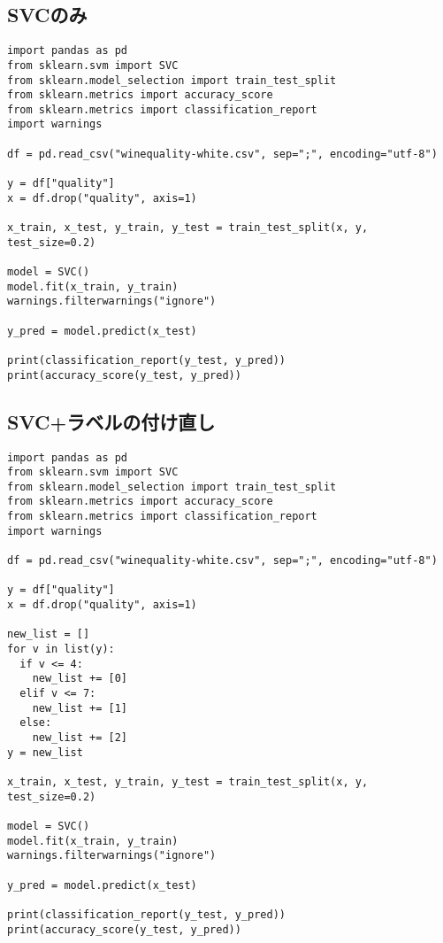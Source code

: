 \documentclass[a4paper, titlepage]{jsarticle}
\begin{document}
	\subsection{SVCのみ}
	\begin{lstlisting}
import pandas as pd
from sklearn.svm import SVC
from sklearn.model_selection import train_test_split
from sklearn.metrics import accuracy_score
from sklearn.metrics import classification_report
import warnings

df = pd.read_csv("winequality-white.csv", sep=";", encoding="utf-8")

y = df["quality"]
x = df.drop("quality", axis=1)

x_train, x_test, y_train, y_test = train_test_split(x, y, test_size=0.2)

model = SVC()
model.fit(x_train, y_train)
warnings.filterwarnings("ignore")

y_pred = model.predict(x_test)

print(classification_report(y_test, y_pred))
print(accuracy_score(y_test, y_pred))
	\end{lstlisting}

	\subsection{SVC+ラベルの付け直し}
	\begin{lstlisting}
import pandas as pd
from sklearn.svm import SVC
from sklearn.model_selection import train_test_split
from sklearn.metrics import accuracy_score
from sklearn.metrics import classification_report
import warnings

df = pd.read_csv("winequality-white.csv", sep=";", encoding="utf-8")

y = df["quality"]
x = df.drop("quality", axis=1)

new_list = []
for v in list(y):
  if v <= 4:
    new_list += [0]
  elif v <= 7:
    new_list += [1]
  else:
    new_list += [2]
y = new_list

x_train, x_test, y_train, y_test = train_test_split(x, y, test_size=0.2)

model = SVC()
model.fit(x_train, y_train)
warnings.filterwarnings("ignore")

y_pred = model.predict(x_test)

print(classification_report(y_test, y_pred))
print(accuracy_score(y_test, y_pred))
	\end{lstlisting}
\end{document}
